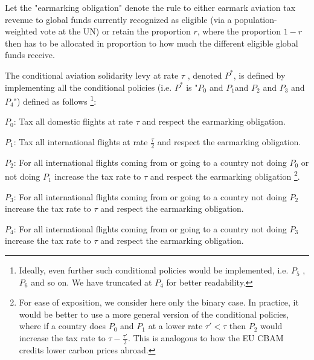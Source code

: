 \begin{definition}
Let the "earmarking obligation" denote the rule to either earmark aviation tax revenue to global funds currently recognized as eligible (via a population-weighted vote at the UN) or retain the proportion $r$, where the proportion $1-r$ then has to be allocated in proportion to how much the different eligible global funds receive.
    
    The conditional aviation solidarity levy at rate $\tau$ , denoted $P^*$, is defined by implementing all the conditional policies (i.e. $P^*$ is  "$P_0$ and $P_1$and $P_2$ and $P_3$ and $P_4$") defined as follows \footnote{Ideally, even further such conditional policies would be implemented, i.e. $P_5$ , $P_6$ and so on. We have truncated at $P_4$  for better readability.}:
    
    
$P_0$: Tax all domestic flights at rate $\tau$ and respect the earmarking obligation.

$P_1$: Tax all international flights at rate $\frac{\tau}{2}$ and respect the earmarking obligation.

$P_2$: For all international flights coming from or going to a country not doing $P_0$  or not doing $P_1$ increase the tax rate to $\tau$ and respect the earmarking obligation \footnote{For ease of exposition, we consider here only the binary case. In practice, it would be better to use a more general version of the conditional policies, where if a country does $P_0$  and $P_1$ at a lower rate $\tau'<\tau$ then $P_2$ would increase the tax rate to $\tau-\frac{\tau'}{2}$. This is analogous to how the EU CBAM credits lower carbon prices abroad.}.

$P_3$: For all international flights coming from or going to a country not doing $P_2$  increase the tax rate to $\tau$ and respect the earmarking obligation.

$P_4$: For all international flights coming from or going to a country not doing $P_3$  increase the tax rate to $\tau$ and respect the earmarking obligation.


\end{definition}

